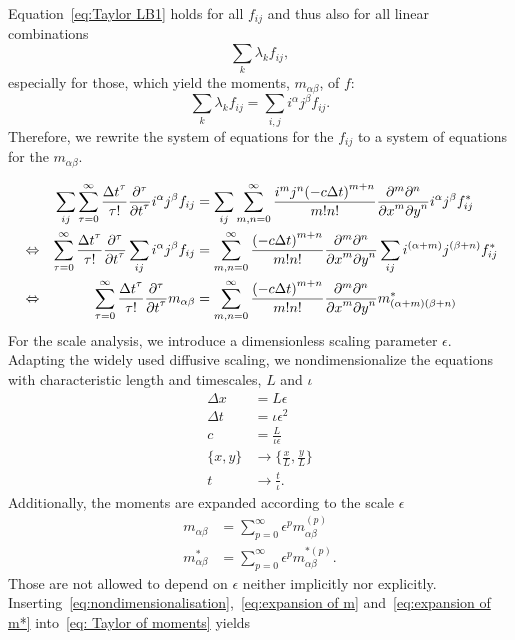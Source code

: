 \documentclass{article}
\begin{document}
Equation~\eqref{eq:Taylor LB1} holds for all $f_{ij}$ and thus also for all linear combinations
\begin{equation*}
  \sum_{k}\lambda_k f_{ij},
\end{equation*}
especially for those, which yield the moments, $m_{\alpha\beta} $, of $f$:
\begin{equation*}
  \sum_{k}\lambda_k f_{ij} = \sum_{i,j}i^\alpha j^\beta f_{ij}.
\end{equation*}
Therefore, we rewrite the system of equations for the $f_{ij}$ to a system of equations for the $m_{\alpha\beta}$.

\begin{align}
    \nonumber
    & & \sum_{ij} \sum_{\tau = 0}^\infty \frac{{\Delta t}^\tau }{\tau!} \frac{\partial^\tau}{{\partial t}^\tau} i^\alpha j^\beta f_{ij} &=
    \sum_{ij}\sum_{m,n = 0}^\infty \frac{i^m j^n {(-c\Delta t)}^{m+n}} {m!n!} \frac{\partial^m \partial^n}{ {\partial x}^m{\partial y}^n}i^\alpha j^\beta f^*_{ij}\\
    \nonumber
    &\Leftrightarrow &
    \sum_{\tau = 0}^\infty \frac{{\Delta t}^\tau }{\tau!} \frac{\partial^\tau}{{\partial t}^\tau} \sum_{ij}i^\alpha j^\beta f_{ij} &=
    \sum_{m,n = 0}^\infty \frac{{(-c\Delta t)}^{m+n}} {m!n!} \frac{\partial^m \partial^n}{ {\partial x}^m{\partial y}^n}\sum_{ij}i^{(\alpha + m)} j^{(\beta+n)} f^*_{ij}\\
      \label{eq: Taylor of moments}
     &\Leftrightarrow &
     \sum_{\tau = 0}^\infty \frac{{\Delta t}^\tau }{\tau!} \frac{\partial^\tau}{{\partial t}^\tau} m_{\alpha\beta} &=
    \sum_{m,n = 0}^\infty \frac{{(-c\Delta t)}^{m+n}} {m!n!} \frac{\partial^m \partial^n}{ {\partial x}^m{\partial y}^n} m^*_{(\alpha + m)(\beta + n)}
\end{align}
For the scale analysis, we introduce a dimensionless scaling parameter $\epsilon$.
Adapting the widely used diffusive scaling, we nondimensionalize the equations with characteristic length and timescales, $L$ and $\iota$
\begin{equation}
  \label{eq:nondimensionalisation}
  \begin{aligned}
    \Delta x & = L\epsilon \\
    \Delta t & = \iota\epsilon^2 \\
    c & = \frac{L}{\iota\epsilon} \\
    \{x, y\} & \rightarrow \{\frac{x}{L}, \frac{y}{L}\} \\
    t & \rightarrow \frac{t}{\iota}.
  \end{aligned}
\end{equation}
Additionally, the moments are expanded according to the scale $\epsilon$
\begin{align}
    \label{eq:expansion of m}
    m_{\alpha\beta} & = \sum_{p=0}^{\infty} \epsilon^p m_{\alpha\beta}^{(p)} \\
    \label{eq:expansion of m*}
    m^*_{\alpha\beta} & = \sum_{p=0}^{\infty} \epsilon^p m_{\alpha\beta}^{*(p)}.
\end{align}
Those are not allowed to depend on $\epsilon$ neither implicitly nor explicitly.
Inserting~\eqref{eq:nondimensionalisation},~\eqref{eq:expansion of m} and~\eqref{eq:expansion of m*} into~\eqref{eq: Taylor of moments} yields
\end{document}
